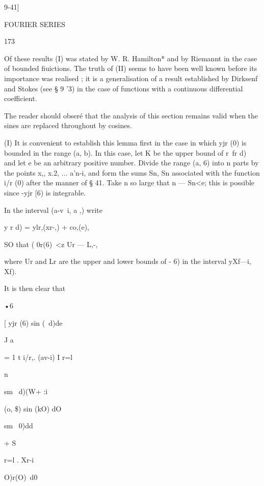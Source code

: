 9-41] 



FOURIER SERIES 



173 



Of these results (I) was stated by W. R. Hamilton* and by Riemannt in the case of 
bounded fiuictions. The truth of (II) seems to have been well known before its importance 
was realised ; it is a generalisation of a result established by Dirksenf and Stokes 
(see § 9 '3) in the case of functions with a continuous differential coefficient. 

The reader should obser\'e that the analysis of this section remains valid when the 
sines are replaced throughout by cosines. 

(I) It is convenient  to establish this lemma first in the case in which 
yjr (0) is bounded in the range (a, b). In this case, let K be the upper bound 
of r\ fr d)\, and let e be an arbitrary positive number. Divide the range (a, 6) 
into n parts by the points x,, x.2, ... a'n-i, and form the sums Sn, Sn associated 
with the function i/r (0) after the manner of § 41. Take n so large that 
 n — Sn<e; this is possible since -yjr [6) is integrable. 

In the interval (a-v\ i, a ,) write 

y r d) = ylr,(xr-,) + co,(e), 

SO that    ( 0r(6)\ <z Ur — L,-, 

where Ur and Lr are the upper and lower bounds of -  6) in the interval 
yXf—i, Xf). 

It is then clear that 

•6 



[ yjr (6) sin (\ d)de 

J a 



= 1 t i/r,. (av-i) 
I r=l 

n 



sm \ d)(W+ :i 



(o,  \$) sin (kO) dO 



sm \ 0)dd 



+ S 

r=l . Xr-i 



O)r(O)\ d0 



